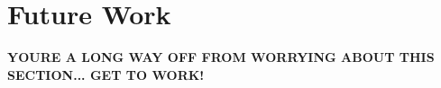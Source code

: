 \chapter{Future Work} \label{CH:future}
\textbf{YOURE A LONG WAY OFF FROM WORRYING ABOUT THIS SECTION... GET TO WORK!}
